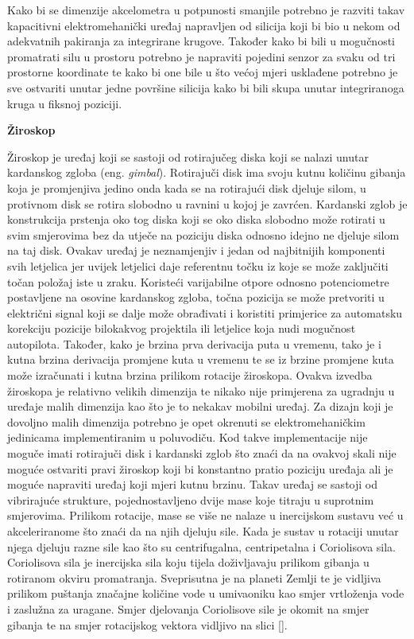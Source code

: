 \documentclass[times, utf8, diplomski]{fer}
\begin{document}
Kako bi se dimenzije akcelometra u potpunosti smanjile potrebno je razviti takav kapacitivni elektromehanički uređaj napravljen od
silicija koji bi bio u nekom od adekvatnih pakiranja za integrirane krugove. Također kako bi bili u mogučnosti promatrati silu u
prostoru potrebno je napraviti pojedini senzor za svaku od tri prostorne koordinate te kako bi one bile u što većoj mjeri usklađene
potrebno je sve ostvariti unutar jedne površine silicija kako bi bili skupa unutar integriranoga kruga u fiksnoj poziciji.

\textbf{Žiroskop}

Žiroskop je uređaj koji se sastoji od rotirajučeg diska koji se nalazi unutar kardanskog zgloba (eng. \textit{gimbal}). Rotirajuči
disk ima svoju kutnu količinu gibanja koja je promjenjiva jedino onda kada se na rotirajući disk djeluje silom, u protivnom
disk se rotira slobodno u ravnini u kojoj je zavrćen. Kardanski zglob je konstrukcija prstenja oko tog diska koji se oko diska
slobodno može rotirati u svim smjerovima bez da utječe na poziciju diska odnosno idejno ne djeluje silom na taj disk. Ovakav uređaj
je neznamjenjiv i jedan od najbitnijih komponenti svih letjelica jer uvijek letjelici daje referentnu točku iz koje se može
zaključiti točan položaj iste u zraku. Koristeći varijabilne otpore odnosno potenciometre postavljene na osovine kardanskog zgloba,
točna pozicija se može pretvoriti u električni signal koji se dalje može obrađivati i koristiti primjerice za
automatsku korekciju pozicije bilokakvog projektila ili letjelice koja nudi mogučnost autopilota. Također, kako je brzina prva
derivacija puta u vremenu, tako je i kutna brzina derivacija promjene kuta u vremenu te se iz brzine promjene kuta može izračunati
i kutna brzina prilikom rotacije žiroskopa. Ovakva izvedba žiroskopa je
relativno velikih dimenzija te nikako nije primjerena za ugradnju u uređaje malih dimenzija kao što je to nekakav mobilni uređaj.
Za dizajn koji je dovoljno malih dimenzija potrebno je opet okrenuti se elektromehaničkim jedinicama implementiranim u poluvodiču.
Kod takve implementacije nije moguče imati rotirajuči disk i kardanski zglob što znaći da na ovakvoj skali nije moguće ostvariti 
pravi žiroskop koji bi konstantno pratio poziciju uređaja ali je moguće napraviti uređaj koji mjeri kutnu brzinu.
Takav uređaj se sastoji od vibrirajuće strukture, pojednostavljeno dvije mase koje titraju u suprotnim smjerovima.
Prilikom rotacije, mase se više ne nalaze u inercijskom sustavu već u akceleriranome što znaći da na njih djeluju sile.
Kada je sustav u rotaciji unutar njega djeluju razne sile kao što su centrifugalna, centripetalna i Coriolisova sila.
Coriolisova sila je inercijska sila koju tijela doživljavaju prilikom gibanja u rotiranom okviru promatranja. Sveprisutna je na 
planeti Zemlji te je vidljiva prilikom puštanja značajne količine vode u umivaoniku kao smjer vrtloženja vode i zaslužna za
uragane. Smjer djelovanja Coriolisove sile je okomit na smjer gibanja te na smjer rotacijskog vektora vidljivo na slici \ref{}.
\end{document}
